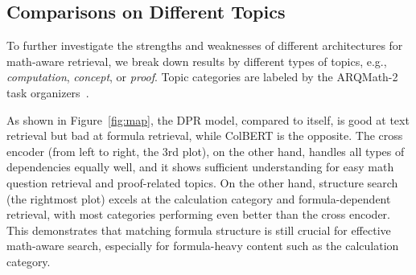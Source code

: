 \documentclass[11pt]{article}
\begin{document}
\subsection{Comparisons on Different Topics}

To further investigate the strengths and weaknesses of different architectures for math-aware retrieval, we break down results by different types of topics, e.g., \textit{computation}, \textit{concept}, or \textit{proof}.
Topic categories are labeled by the ARQMath-2 task organizers~\cite{mansouri2021arqmath2review}.

As shown in Figure~\ref{fig:map}, the DPR model, compared to itself, is good at text retrieval but bad at formula retrieval, while ColBERT is the opposite.
The cross encoder (from left to right, the 3rd plot), on the other hand, handles all types of dependencies equally well, and it shows sufficient understanding for easy math question retrieval and proof-related topics.
On the other hand, structure search (the rightmost plot) excels at the calculation category and formula-dependent retrieval, with most categories performing even better than the cross encoder.
This demonstrates that matching formula structure is still crucial for effective math-aware search, especially for formula-heavy content such as the calculation category.
\end{document}

